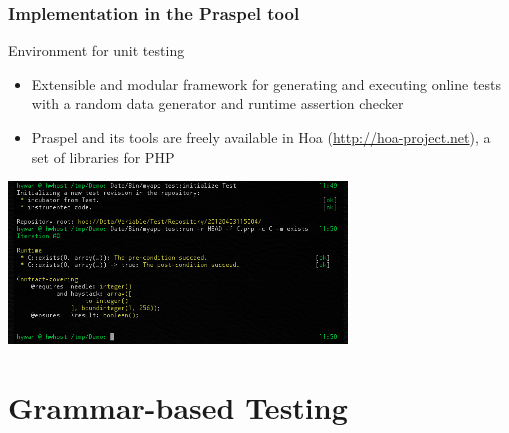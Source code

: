 \documentclass[9pt]{beamer}
\begin{document}
%
%
%
%
%

\begin{frame}
\frametitle{Implementation in the Praspel tool}

\begin{block}{Environment for unit testing}
\begin{itemize}
\item Extensible and modular framework for generating and executing online tests
with a random data generator and runtime assertion checker
\item Praspel and its tools are freely available in Hoa
(\url{http://hoa-project.net}), a set of libraries for PHP
\end{itemize}
\end{block}
\begin{center}
\includegraphics[width=9cm]{Figures/Praspel_execution.png}
\end{center}

\end{frame}

\section{Grammar-based Testing}
\end{document}
